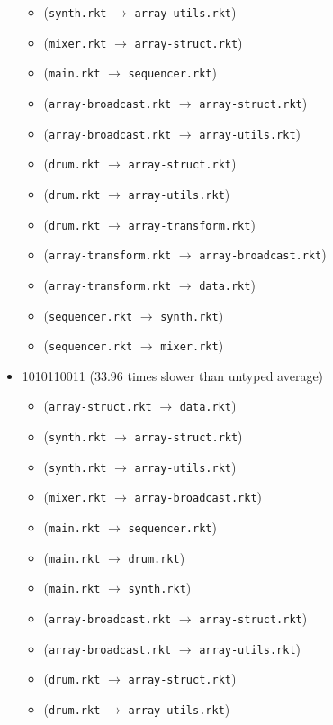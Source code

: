 \documentclass{article}
\newcommand{\mono}[1]{\texttt{#1}}
\begin{document}
\begin{itemize}
\begin{itemize}
  \item (\mono{synth.rkt} $\rightarrow$ \mono{array-utils.rkt})
  \item (\mono{mixer.rkt} $\rightarrow$ \mono{array-struct.rkt})
  \item (\mono{main.rkt} $\rightarrow$ \mono{sequencer.rkt})
  \item (\mono{array-broadcast.rkt} $\rightarrow$ \mono{array-struct.rkt})
  \item (\mono{array-broadcast.rkt} $\rightarrow$ \mono{array-utils.rkt})
  \item (\mono{drum.rkt} $\rightarrow$ \mono{array-struct.rkt})
  \item (\mono{drum.rkt} $\rightarrow$ \mono{array-utils.rkt})
  \item (\mono{drum.rkt} $\rightarrow$ \mono{array-transform.rkt})
  \item (\mono{array-transform.rkt} $\rightarrow$ \mono{array-broadcast.rkt})
  \item (\mono{array-transform.rkt} $\rightarrow$ \mono{data.rkt})
  \item (\mono{sequencer.rkt} $\rightarrow$ \mono{synth.rkt})
  \item (\mono{sequencer.rkt} $\rightarrow$ \mono{mixer.rkt})
  \end{itemize}
\item 1010110011 (33.96 times slower than untyped average)
  \begin{itemize}
  \item (\mono{array-struct.rkt} $\rightarrow$ \mono{data.rkt})
  \item (\mono{synth.rkt} $\rightarrow$ \mono{array-struct.rkt})
  \item (\mono{synth.rkt} $\rightarrow$ \mono{array-utils.rkt})
  \item (\mono{mixer.rkt} $\rightarrow$ \mono{array-broadcast.rkt})
  \item (\mono{main.rkt} $\rightarrow$ \mono{sequencer.rkt})
  \item (\mono{main.rkt} $\rightarrow$ \mono{drum.rkt})
  \item (\mono{main.rkt} $\rightarrow$ \mono{synth.rkt})
  \item (\mono{array-broadcast.rkt} $\rightarrow$ \mono{array-struct.rkt})
  \item (\mono{array-broadcast.rkt} $\rightarrow$ \mono{array-utils.rkt})
  \item (\mono{drum.rkt} $\rightarrow$ \mono{array-struct.rkt})
  \item (\mono{drum.rkt} $\rightarrow$ \mono{array-utils.rkt})

\end{itemize}
\end{itemize}
\end{document}
